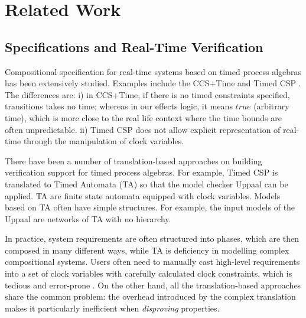 \documentclass[acmsmall,10pt,review]{acmart}
\newcommand{\code}[1]{{\tt{\ensuremath{\m{#1}}}}}
\newcommand{\empt}{\textcolor{black}{\ensuremath{\epsilon}}}
\newcommand{\m}{\mathit}
\begin{document}
\section{Related Work}\label{sec:Related_work}





\subsection{Specifications and Real-Time Verification}






Compositional specification for real-time systems based on timed process algebras has been extensively studied. Examples include the CCS\code{\text{+}}Time \cite{yi1991ccs} and Timed CSP \cite{dong2008timed}.  
The differences are: 
i) in CCS\code{\text{+}}Time, if there is no timed constraints specified, transitions takes no time; whereas in our effects logic, it means \code{true} (arbitrary time), which is more close to the real life context where the time bounds are often unpredictable.
ii) Timed CSP does not allow explicit representation of real-time through the manipulation of clock variables.



There have been a number of translation-based approaches on building verification support for timed process algebras. For example, Timed CSP \cite{dong2008timed} is translated to Timed Automata (TA) so that the model checker Uppaal can be \cite{DBLP:journals/sttt/LarsenPY97} applied. 
TA are finite state automata equipped with clock variables. Models based on TA often have simple structures. For example, the input models of the Uppaal are networks of TA with no hierarchy. 


In practice, system requirements are often structured into phases, which are then composed in many different ways, while TA is deficiency in modelling complex compositional systems. Users often need to manually cast high-level requirements into a set of clock variables with carefully calculated clock constraints, which is tedious and error-prone \cite{sun2013modeling}. 
On the other hand, all the translation-based approaches share the common problem: 
the overhead introduced by
the complex translation makes it particularly inefficient when \emph{disproving} properties. 
\end{document}
